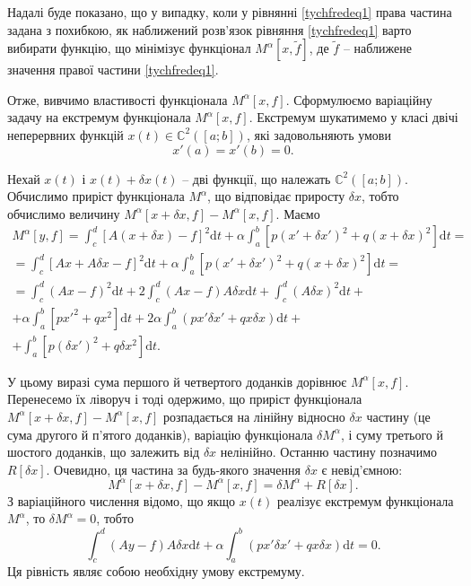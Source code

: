 \documentclass[14pt,twoside]{extreport}
\theoremstyle{mystyle}
\numberwithin{equation}{chapter}
\begin{document}
Надалі буде показано, що у випадку, коли у рівнянні \eqref{tychfredeq1} права частина задана з похибкою, як наближений розв'язок рівняння \eqref{tychfredeq1} варто вибирати функцію, що мінімізує функціонал $M^{\alpha}[x, \tilde{f}]$, де $\tilde{f}$ -- наближене значення правої частини \eqref{tychfredeq1}.

Отже, вивчимо властивості функціонала $M^{\alpha}[x, f]$. Сформулюємо варіаційну задачу на екстремум функціонала $M^{\alpha}[x, f]$. Екстремум шукатимемо у класі двічі неперервних функцій $x(t) \in \mathbb{C}^2([a; b])$, які задовольняють умови
\begin{equation}\label{dercond}
	x'(a)=x'(b)=0.
\end{equation}

Нехай $x(t)$ і $x(t) + \delta x(t)$ -- дві функції, що належать $\mathbb{C}^2([a; b])$. Обчислимо приріст функціонала $M^{\alpha}$, що відповідає приросту $\delta x$, тобто обчислимо величину $M^{\alpha}[x+\delta x, f] - M^{\alpha}[x, f]$. Маємо
\begin{multline*}
M^{\alpha}[y, f] = \int_{c}^{d}[A(x+\delta x) - f]^2\mathrm{d}t +\alpha \int_{a}^{b}[p(x'+\delta x')^2 + q(x + \delta x)^2]\mathrm{d}t =\\
=\int_{c}^{d}[Ax+A\delta x-f]^{2}\mathrm{d}t+\alpha\int_{a}^{b}[p(x'+\delta x')^{2}+q(x+\delta x)^{2}]\mathrm{d}t=\\
=\int_{c}^{d}(Ax-f)^{2}\mathrm{d}t+2\int_{c}^{d}(Ax-f)A\delta x\mathrm{d}t+\int_{c}^{d}(A\delta x)^{2}\mathrm{d}t+\\
+\alpha\int_{a}^{b}[px'^{2}+qx^{2}]\mathrm{d}t+2\alpha\int_{a}^{b}(px'\delta x' + qx\delta x)\mathrm{d}t+\\
+\int_{a}^{b}[p(\delta x')^{2}+q\delta x^{2}]\mathrm{d}t.
\end{multline*}

У цьому виразі сума першого й четвертого доданків дорівнює $M^{\alpha}[x, f]$. Перенесемо їх ліворуч і тоді одержимо, що приріст функціонала $M^{\alpha}[x+\delta x, f] - M^{\alpha}[x, f]$ розпадається на лінійну відносно $\delta x$ частину (це сума другого й п'ятого доданків), варіацію функціонала $\delta M^{\alpha}$, і суму третього й шостого доданків, що залежить від $\delta x$ нелінійно. Останню частину позначимо $R[\delta x]$. Очевидно, ця частина за будь-якого значення $\delta x$ є невід'ємною:
\begin{equation}\label{madelta}
	M^{\alpha}[x+\delta x, f]-M^{\alpha}[x, f]=\delta M^{\alpha}+R[\delta x].
\end{equation}
З варіаційного числення відомо, що якщо $x(t)$ реалізує екстремум функціонала $M^{\alpha}$, то $\delta M^{\alpha} = 0$, тобто
\begin{equation}\label{tychextrfunct}
\int_{c}^{d}(Ay-f)A\delta x\mathrm{d}t+\alpha \int_{a}^{b}(px'\delta x'+qx\delta x)\mathrm{d}t=0.
\end{equation}
Ця рівність являє собою необхідну умову екстремуму.
\end{document}
